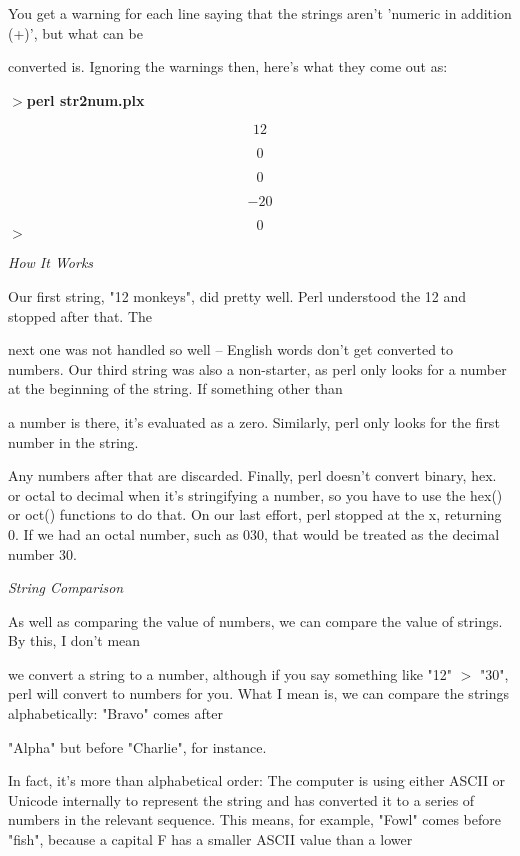 \documentclass[a4paper,11pt]{book}
\begin{document}
\noindent You get a warning for each line saying that the strings aren't 'numeric in addition (+)', but what can be

\noindent converted is. Ignoring the warnings then, here's what they come out as:

\noindent 

\noindent $>$\textbf{perl str2num.plx}

\[12\] 

\[0\] 

\[0\] 

\[-20\] 

\[0\] 
$>$

\noindent 

\noindent \textit{How It Works}

\noindent Our first string, "12 monkeys", did pretty well. Perl understood the 12 and stopped after that. The

\noindent next one was not handled so well -- English words don't get converted to numbers. Our third string was also a non-starter, as perl only looks for a number at the beginning of the string. If something other than

\noindent a number is there, it's evaluated as a zero. Similarly, perl only looks for the first number in the string.

\noindent Any numbers after that are discarded. Finally, perl doesn't convert binary, hex. or octal to decimal when it's stringifying a number, so you have to use the hex() or oct() functions to do that. On our last effort, perl stopped at the x, returning 0. If we had an octal number, such as 030, that would be treated as the decimal number 30.

\noindent 

\noindent \textit{String Comparison}

\noindent As well as comparing the value of numbers, we can compare the value of strings. By this, I don't mean

\noindent we convert a string to a number, although if you say something like "12" $>$ "30", perl will convert to numbers for you. What I mean is, we can compare the strings alphabetically: "Bravo" comes after

\noindent "Alpha" but before "Charlie", for instance.

\noindent 

\noindent In fact, it's more than alphabetical order: The computer is using either ASCII or Unicode internally to represent the string and has converted it to a series of numbers in the relevant sequence. This means, for example, "Fowl" comes before "fish", because a capital F has a smaller ASCII value than a lower
\end{document}
